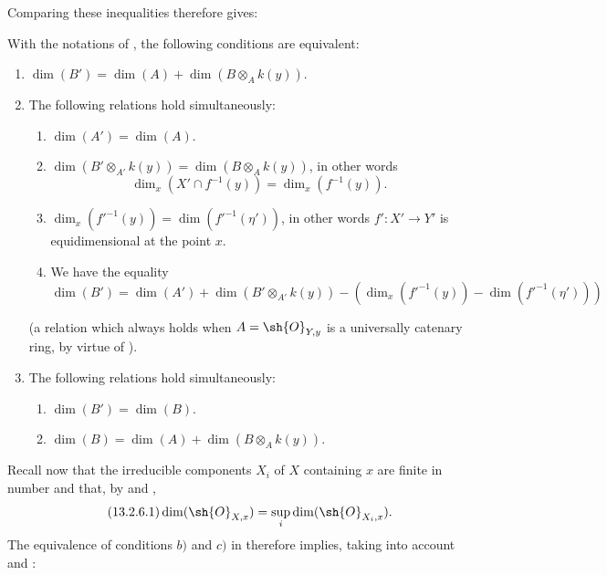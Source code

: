
Comparing these inequalities therefore gives:

\begin{lemma}[13.2.5]
\label{IV.13.2.5}
With the notations of , the following conditions are equivalent:
\begin{enumerate}[label=\emph{\alph*)}]
  \item $\dim(B')=\dim(A)+\dim(B\otimes_A k(y))$.
  \item The following relations hold simultaneously:
  \begin{enumerate}[label=(\roman*)]
    \item $\dim(A')=\dim(A)$.
    \item $\dim(B'\otimes_{A'}k(y))=\dim(B\otimes_A k(y))$, in other words
    \[
      \dim_x(X'\cap f^{-1}(y))=\dim_x(f^{-1}(y)).
    \]
    \item $\dim_x(f'^{-1}(y))=\dim(f'^{-1}(\eta'))$, in other words $f':X'\to Y'$ is equidimensional  at the point $x$.
    \item We have the equality
    \[
      \dim(B')=\dim(A')+\dim(B'\otimes_{A'}k(y))-(\dim_x(f'^{-1}(y))-\dim(f'^{-1}(\eta')))
    \]
  \end{enumerate}
  (a relation which always holds when $A=\sh{O}_{Y,y}$ is a universally catenary ring, by virtue of ).
  \item The following relations hold simultaneously:
  \begin{enumerate}[label=(\roman*)]
    \item $\dim(B')=\dim(B)$.
    \item $\dim(B)=\dim(A)+\dim(B\otimes_A k(y))$.
  \end{enumerate}
\end{enumerate}
\end{lemma}

\begin{env}[13.2.6]
\label{IV.13.2.6}
Recall now that the irreducible components $X_i$ of $X$ containing $x$ are finite in number and that, by  and ,
\[
\label{IV.13.2.6.1}
\tag{13.2.6.1}
  \dim(\sh{O}_{X,x})=\sup_i\dim(\sh{O}_{X_i,x}).
\]
The equivalence of conditions $b)$ and $c)$ in  therefore implies, taking into account  and :
\end{env}

